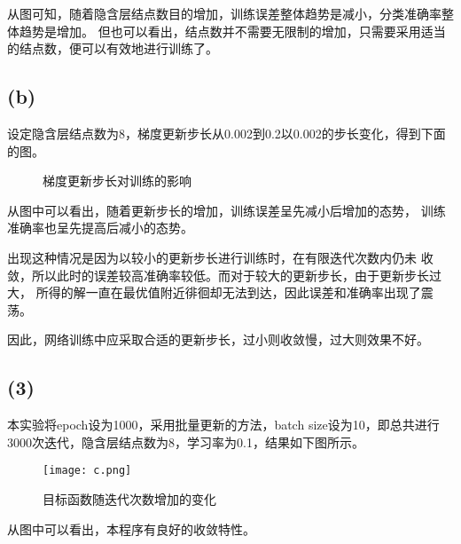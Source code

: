 \documentclass{article}
\renewcommand{\part}[1]{\subsection*{(#1)}}
\begin{document}
从图可知，随着隐含层结点数目的增加，训练误差整体趋势是减小，分类准确率整体趋势是增加。
但也可以看出，结点数并不需要无限制的增加，只需要采用适当的结点数，便可以有效地进行训练了。

\part{b}
设定隐含层结点数为8，梯度更新步长从0.002到0.2以0.002的步长变化，得到下面的图。
\begin{figure}[ht]
	\centering
	\centering
	\caption{梯度更新步长对训练的影响}
	\label{figl}
\end{figure}

从图中可以看出，随着更新步长的增加，训练误差呈先减小后增加的态势，
训练准确率也呈先提高后减小的态势。

出现这种情况是因为以较小的更新步长进行训练时，在有限迭代次数内仍未
收敛，所以此时的误差较高准确率较低。而对于较大的更新步长，由于更新步长过大，
所得的解一直在最优值附近徘徊却无法到达，因此误差和准确率出现了震荡。

因此，网络训练中应采取合适的更新步长，过小则收敛慢，过大则效果不好。

\part{3}
本实验将epoch设为1000，采用批量更新的方法，batch size设为10，即总共进行
3000次迭代，隐含层结点数为8，学习率为0.1，结果如下图所示。
\begin{figure}[ht]
	\centering
	\texttt{[image: c.png]}
	\caption{目标函数随迭代次数增加的变化}
	\label{figl}
\end{figure}
从图中可以看出，本程序有良好的收敛特性。
\end{document}
